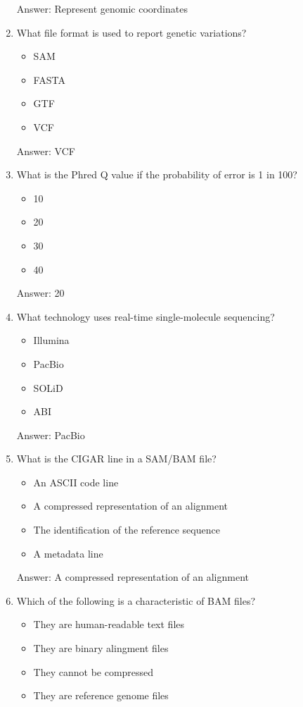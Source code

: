 \begin{enumerate}
Answer: Represent genomic coordinates

\item What file format is used to report genetic variations?
\begin{itemize}
\item SAM
\item FASTA
\item GTF
\item VCF
\end{itemize}

Answer: VCF

\item What is the Phred Q value if the probability of error is 1 in 100?
\begin{itemize}
\item 10
\item 20
\item 30
\item 40
\end{itemize}

Answer: 20

\item What technology uses real-time single-molecule sequencing?
\begin{itemize}
\item Illumina
\item PacBio
\item SOLiD
\item ABI
\end{itemize}

Answer: PacBio

\item What is the CIGAR line in a SAM/BAM file?
\begin{itemize}
\item An ASCII code line
\item A compressed representation of an alignment
\item The identification of the reference sequence
\item A metadata line
\end{itemize}

Answer: A compressed representation of an alignment

\item Which of the following is a characteristic of BAM files?
\begin{itemize}
\item They are human-readable text files
\item They are binary alingment files
\item They cannot be compressed
\item They are reference genome files
\end{itemize}


\end{enumerate}
